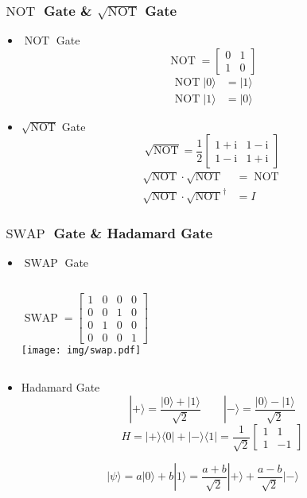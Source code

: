 \documentclass[UTF8,11pt,colorlinks,compress,openany]{beamer}%
\begin{document}
\begin{frame}\frametitle{$\operatorname{NOT}$ Gate \& $\sqrt{\operatorname{NOT}}$ Gate}
\begin{itemize}
	\item $\operatorname{NOT}$ Gate
	\[\operatorname{NOT}=\begin{bmatrix}
		0 & 1\\
		1 & 0
	\end{bmatrix}\]
	\begin{align*}
		\operatorname{NOT} |0\rangle&=|1\rangle\\
		\operatorname{NOT} |1\rangle&=|0\rangle
	\end{align*}
	\item $\sqrt{\operatorname{NOT}}$ Gate
	\[\sqrt{\operatorname{NOT}}=\frac{1}{2}\begin{bmatrix}
		1+\mathrm{i} & 1-\mathrm{i} \\
		1-\mathrm{i} & 1+\mathrm{i}
	\end{bmatrix}\]
	\begin{align*}
		\sqrt{\operatorname{NOT}}\cdot \sqrt{\operatorname{NOT}}&=\operatorname{NOT} \\
		\sqrt{\operatorname{NOT}}\cdot \sqrt{\operatorname{NOT}}^\dagger&=I
	\end{align*}
\end{itemize}
\end{frame}

\begin{frame}\frametitle{$\operatorname{SWAP}$ Gate \& Hadamard Gate}
	\begin{itemize}
		\item $\operatorname{SWAP}$ Gate
		\begin{columns}
		\[\operatorname{SWAP} = \begin{bmatrix} 1&0&0&0\\0&0&1&0\\0&1&0&0\\0&0&0&1\end{bmatrix}\]
		\texttt{[image: img/swap.pdf]}
		\end{columns}
		\item Hadamard Gate
		\[|+\rangle=\frac{|0\rangle +|1\rangle}{\sqrt{2}}\qquad |-\rangle=\frac{|0\rangle -|1\rangle}{\sqrt{2}}\]
		\[H=|+\rangle\langle 0|+|-\rangle\langle 1| = \frac{1}{\sqrt{2}} \begin{bmatrix} 1 & 1 \\ 1 & -1 \end{bmatrix}\]
	\end{itemize}
	\[|\psi\rangle=a|0\rangle+b|1\rangle=\frac{a+b}{\sqrt{2}}|+\rangle+\frac{a-b}{\sqrt{2}}|-\rangle\]
\end{frame}
\end{document}
